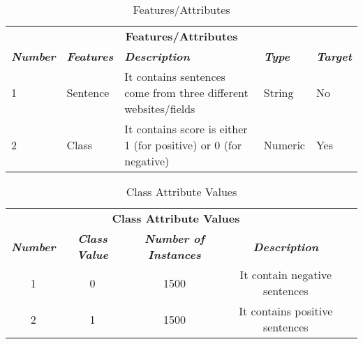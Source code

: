 \documentclass{article}
\begin{document}
\begin{table}[htbp]
\caption{Features/Attributes}
\begin{center}
\begin{tabular}{|m{5em}|m{5em}|m{15em}|m{5em}|m{5em}|}
\hline
\multicolumn{5}{|c|}{\textbf{Features/Attributes}} \\
\cline{1-5} 
\textbf{\textit{Number}}&
\textbf{\textit{Features}}&
\textbf{\textit{Description}}&
\textbf{\textit{Type}}&
\textbf{\textit{Target}}\\
\hline
1 & Sentence & It contains sentences come  from three different websites/fields & String & No\\
\hline
2 & Class & It contains score is either 1 (for positive) or 0 (for negative) & Numeric & Yes \\
\hline

\end{tabular}
\label{tab1}
\end{center}
\end{table}

\begin{table}[htbp]
\caption{Class Attribute Values}
\begin{center}
\begin{tabular}{|c|c|c|c|c|}
\hline
\multicolumn{4}{|c|}{\textbf{Class Attribute Values}} \\
\cline{1-4} 
\textbf{\textit{Number}}&
\textbf{\textit{Class Value}}&
\textbf{\textit{Number of Instances}}&
\textbf{\textit{Description}}\\
\hline
1 & 0 & 1500 & It contain negative   sentences \\
\hline
2 & 1 & 1500 & It contains positive sentences \\
\hline

\end{tabular}
\label{tab1}
\end{center}
\end{table}
\end{document}
